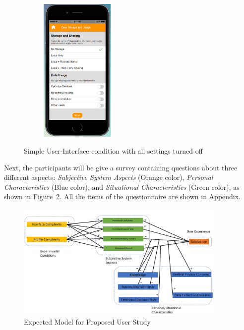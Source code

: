 \begin{figure}
\begin{subfigure}[t]{0.24\textwidth}
	\end{subfigure}%
	~
	\begin{subfigure}[t]{0.24\textwidth}
		\centering
		\includegraphics[height=2.8in]{figures/ui1allOff4.png}
	\end{subfigure}%
	\caption{Simple User-Interface condition with all settings turned off}
	\label{fig:ui1AllOff}
\end{figure}

Next, the participants will be give a survey containing questions about three different aspects: \textit{Subjective System Aspects} (Orange color), \textit{Personal Characteristics} (Blue color), and \textit{Situational Characteristics} (Green color), as shown in Figure~\ref{fig:uimodel}. All the items of the questionnaire are shown in Appendix.

\begin{figure}
	\centering
	\includegraphics[width=0.9\textwidth]{figures/uimodel.pdf}
	\caption{Expected Model for Proposed User Study}
	\label{fig:uimodel}
\end{figure}

